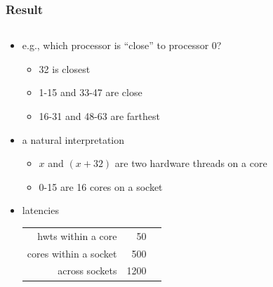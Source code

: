\documentclass[12pt,dvipdfmx]{beamer}
\begin{document}
\begin{frame}
\frametitle{Result}
\begin{columns}
\begin{column}{0.5\textwidth}
  \begin{itemize}
  \item e.g., which processor is ``close'' to processor $0$?
    \begin{itemize}
    \item 32 is closest
    \item 1-15 and 33-47 are close
    \item 16-31 and 48-63 are farthest
    \end{itemize}

  \item a natural interpretation
    \begin{itemize}
    \item $x$ and $(x+32)$ are two hardware threads on a core
    \item 0-15 are 16 cores on a socket
    \end{itemize}
  \item latencies
{\footnotesize
\begin{tabular}{|r|r|r|}\hline
hwts within a core & 50 \\
cores within a socket & 500 \\
across sockets & 1200 \\\hline
\end{tabular}}
  \end{itemize}
\end{column}
\begin{column}{0.5\textwidth}
{\scriptsize}
\end{column}
\end{columns}
\end{frame}



\fi
\end{document}

